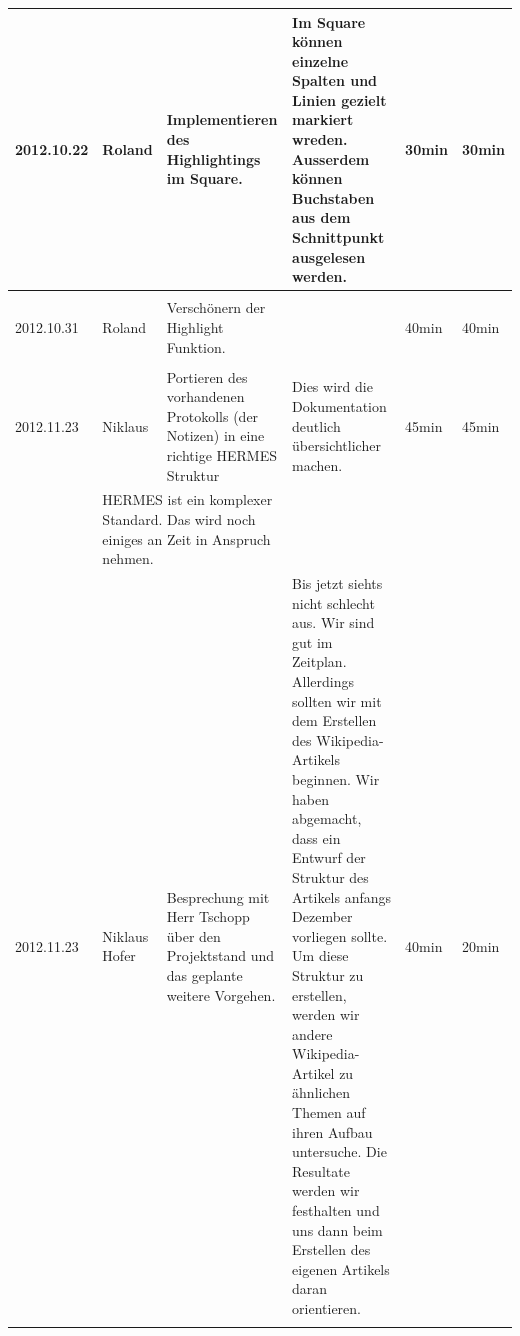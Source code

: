 \documentclass[11pt,paper=a4,final]{scrartcl}
\begin{document}
\begin{landscape}
\begin{longtable}{|p{1.8cm}|p{1.5cm}|p{5.0cm}|p{11.0cm}|l|l|}
    \hline
    2012.10.22 & Roland &
    Implementieren des Highlightings im Square.&
    Im Square k\"onnen einzelne Spalten und Linien gezielt markiert wreden. Ausserdem k\"onnen Buchstaben aus dem Schnittpunkt ausgelesen werden.&
    30min & 30min \\ \hline \nopagebreak
    \multicolumn{2}{|l|}{\bf Pendenzen} &\multicolumn{2}{p{16.0cm}|}{}  & \multicolumn{2}{l|}{} \\ \hline
    \hline
    2012.10.31 & Roland &
    Versch\"onern der Highlight Funktion.&
    &
    40min & 40min \\ \hline \nopagebreak
    \multicolumn{2}{|l|}{\bf Pendenzen} &\multicolumn{2}{p{16.0cm}|}{}  & \multicolumn{2}{l|}{} \\ \hline
    \hline
    2012.11.23 & Niklaus &
    Portieren des vorhandenen Protokolls (der Notizen) in eine richtige HERMES
    Struktur&
    Dies wird die Dokumentation deutlich \"ubersichtlicher machen.&
    45min & 45min \\ \hline \nopagebreak
    \multicolumn{2}{|l|}{\bf Pendenzen} &\multicolumn{2}{p{16.0cm}|}{HERMES ist
    ein komplexer Standard. Das wird noch einiges an Zeit in Anspruch nehmen.}  & \multicolumn{2}{l|}{} \\ \hline
    \hline
    2012.11.23 & Niklaus Hofer &
    Besprechung mit Herr Tschopp \"uber den Projektstand und das geplante
    weitere Vorgehen. & Bis jetzt siehts nicht schlecht aus. Wir sind gut im
    Zeitplan. Allerdings sollten wir mit dem Erstellen des Wikipedia-Artikels
    beginnen. Wir haben abgemacht, dass ein Entwurf der Struktur des Artikels
    anfangs Dezember vorliegen sollte. Um diese Struktur zu erstellen, werden
    wir andere Wikipedia-Artikel zu \"ahnlichen Themen auf ihren Aufbau
    untersuche. Die Resultate werden wir festhalten und uns dann beim Erstellen
    des eigenen Artikels daran orientieren.&
    40min & 20min \\ \hline \nopagebreak

\end{longtable}
\end{landscape}
\end{document}
